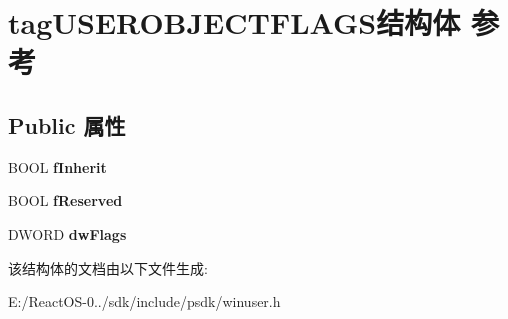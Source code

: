 \hypertarget{structtag_u_s_e_r_o_b_j_e_c_t_f_l_a_g_s}{}\section{tag\+U\+S\+E\+R\+O\+B\+J\+E\+C\+T\+F\+L\+A\+G\+S结构体 参考}
\label{structtag_u_s_e_r_o_b_j_e_c_t_f_l_a_g_s}
\subsection*{Public 属性}
\begin{DoxyCompactItemize}
\item 
\mbox{\label{structtag_u_s_e_r_o_b_j_e_c_t_f_l_a_g_s_a40e50f246b6bf21de5790f439bf16e37}} 
B\+O\+OL {\bfseries f\+Inherit}
\item 
\mbox{\label{structtag_u_s_e_r_o_b_j_e_c_t_f_l_a_g_s_a181b60ea5914dfe51be5340365f2234c}} 
B\+O\+OL {\bfseries f\+Reserved}
\item 
\mbox{\label{structtag_u_s_e_r_o_b_j_e_c_t_f_l_a_g_s_ad4d4cc5da65e767f075bff5e512f03a9}} 
D\+W\+O\+RD {\bfseries dw\+Flags}
\end{DoxyCompactItemize}


该结构体的文档由以下文件生成\+:\begin{DoxyCompactItemize}
\item 
E\+:/\+React\+O\+S-\/0../sdk/include/psdk/winuser.\+h\end{DoxyCompactItemize}
